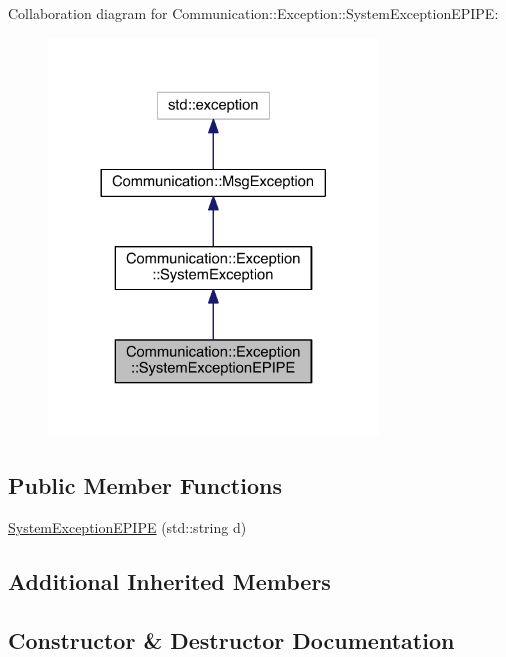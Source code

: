 Collaboration diagram for Communication\+:\+:Exception\+:\+:System\+Exception\+E\+P\+I\+P\+E\+:\nopagebreak
\begin{figure}[H]
\begin{center}
\leavevmode
\includegraphics[width=248pt]{class_communication_1_1_exception_1_1_system_exception_e_p_i_p_e__coll__graph}
\end{center}
\end{figure}
\subsection*{Public Member Functions}
\begin{DoxyCompactItemize}
\item 
\hyperlink{class_communication_1_1_exception_1_1_system_exception_e_p_i_p_e_a9cb9d53911efcd69b8b78756b9715957}{System\+Exception\+E\+P\+I\+P\+E} (std\+::string d)
\end{DoxyCompactItemize}
\subsection*{Additional Inherited Members}


\subsection{Constructor \& Destructor Documentation}
\hypertarget{class_communication_1_1_exception_1_1_system_exception_e_p_i_p_e_a9cb9d53911efcd69b8b78756b9715957}{}
